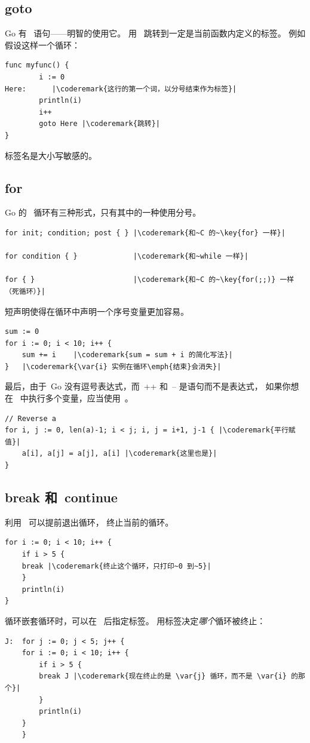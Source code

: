 \subsection{goto}
Go 有~ 语句——明智的使用它。
用~ 跳转到一定是当前函数内定义的标签。
例如假设这样一个循环：
\begin{lstlisting}
func myfunc() {
        i := 0                                                                                      
Here:	   |\coderemark{这行的第一个词，以分号结束作为标签}|
        println(i)
        i++ 
        goto Here |\coderemark{跳转}|
}
\end{lstlisting}
标签名是大小写敏感的。

\subsection{for}
\label{sec:for}
Go 的~ 循环有三种形式，只有其中的一种使用分号。
\begin{lstlisting}
for init; condition; post { } |\coderemark{和~C 的~\key{for} 一样}|

for condition { }             |\coderemark{和~while 一样}|

for { }                       |\coderemark{和~C 的~\key{for(;;)} 一样（死循环）}|
\end{lstlisting}
短声明使得在循环中声明一个序号变量更加容易。
\begin{lstlisting}
sum := 0
for i := 0; i < 10; i++ {
    sum += i	|\coderemark{sum = sum + i 的简化写法}|
}   |\coderemark{\var{i} 实例在循环\emph{结束}会消失}|
\end{lstlisting}
最后，由于~Go 没有逗号表达式，而~++ 和~-- 是语句而不是表达式，
如果你想在~ 中执行多个变量，应当使用~。
\begin{lstlisting}
// Reverse a
for i, j := 0, len(a)-1; i < j; i, j = i+1, j-1 { |\coderemark{平行赋值}|
    a[i], a[j] = a[j], a[i] |\coderemark{这里也是}|
}
\end{lstlisting}

\subsection{break 和~continue}
利用~ 可以提前退出循环， 终止当前的循环。
\begin{lstlisting}
for i := 0; i < 10; i++ {
    if i > 5 {
	break |\coderemark{终止这个循环，只打印~0 到~5}|
    }
    println(i)
}
\end{lstlisting}
循环嵌套循环时，可以在~ 后指定标签。
用标签决定\emph{哪个}循环被终止：
\begin{lstlisting}
J:  for j := 0; j < 5; j++ {
	for i := 0; i < 10; i++ {
	    if i > 5 { 
		break J	|\coderemark{现在终止的是 \var{j} 循环，而不是 \var{i} 的那个}|
	    }
	    println(i)
	}
    } 
\end{lstlisting}

